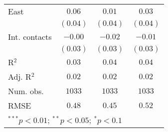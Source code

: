 \begin{table}
\begin{center}
\begin{tabular}{l c c c}
East                 & $0.06$        & $0.01$        & $0.03$        \\
                     & $(0.04)$      & $(0.04)$      & $(0.04)$      \\
Int. contacts        & $-0.00$       & $-0.02$       & $-0.01$       \\
                     & $(0.03)$      & $(0.03)$      & $(0.03)$      \\
\midrule
R$^2$                & $0.03$        & $0.04$        & $0.04$        \\
Adj. R$^2$           & $0.02$        & $0.02$        & $0.02$        \\
Num. obs.            & $1033$        & $1033$        & $1033$        \\
RMSE                 & $0.48$        & $0.45$        & $0.52$        \\
\bottomrule
\multicolumn{4}{l}{\scriptsize{$^{***}p<0.01$; $^{**}p<0.05$; $^{*}p<0.1$}}
\end{tabular}
\label{tab_host}
\end{center}
\end{table}
